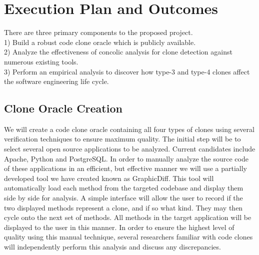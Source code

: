 \documentclass{article}
\newcommand{\todo}[1]{\colorbox{yellow}{\textbf{[#1]}}}
\newcommand{\dan}[1]{\textcolor{blue}{{\it [Dan says: #1]}}}
\begin{document}

% 


\section{Execution Plan and Outcomes}


There are three primary components to the proposed project. \\
1) Build a robust code clone oracle which is publicly available. \\
2) Analyze the effectiveness of concolic analysis for clone detection against numerous existing tools. \\
3) Perform an empirical analysis to discover how type-3 and type-4 clones affect the software engineering life cycle.




\subsection{Clone Oracle Creation}
We will create a code clone oracle containing all four types of clones using several verification techniques to ensure maximum quality. The initial step will be to select several open source applications to be analyzed. Current candidates include Apache, Python and PostgreSQL. In order to manually analyze the source code of these applications in an efficient, but effective manner we will use a partially developed tool we have created known as GraphicDiff. This tool will automatically load each method from the targeted codebase and display them side by side for analysis. A simple interface will allow the user to record if the two displayed methods represent a clone, and if so what kind. They may then cycle onto the next set of methods. All methods in the target application will be displayed to the user in this manner. In order to ensure the highest level of quality using this manual technique, several researchers familiar with code clones will independently perform this analysis and discuss any discrepancies.
\end{document}
